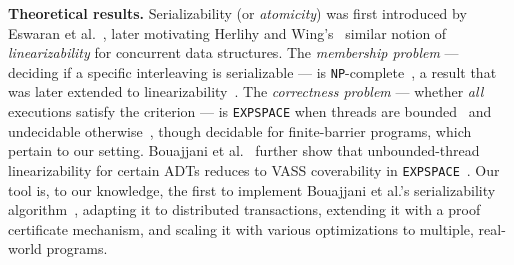
\textbf{Theoretical results.}
Serializability (or \emph{atomicity}) was
first introduced by Eswaran et al.~\cite{EsGrKoTr76},
later motivating Herlihy and Wing's~\cite{HeWe87,HeWi90} similar notion of \emph{linearizability} for concurrent data structures. 
%
The \emph{membership problem} --- deciding if a specific interleaving is serializable --- is \texttt{NP}-complete~\cite{Pa79}, a result that was later extended to
linearizability~\cite{GiKo97}. 
The \emph{correctness problem} --- whether \emph{all} executions satisfy the criterion --- is \texttt{EXPSPACE} when threads are bounded~\cite{AlMcPe96} and undecidable otherwise~\cite{BoEmEnHa13}, though decidable for finite-barrier programs, which pertain to our setting. Bouajjani et al.~\cite{BoEmEnHa18} further show that unbounded-thread linearizability for certain ADTs reduces to VASS coverability in \texttt{EXPSPACE}~\cite{Ra78}. Our tool is, to our knowledge, the first to implement Bouajjani et al.’s serializability algorithm~\cite{BoEmEnHa13}, adapting it to distributed transactions, extending it with a proof certificate mechanism, and scaling it with various optimizations to multiple, real-world programs. 

